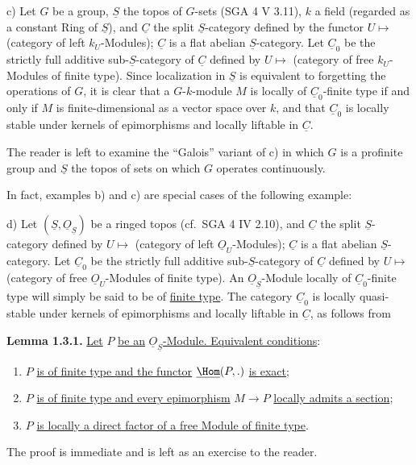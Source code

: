 c) Let \(G\) be a group, \(\underline{S}\) the topos of \(G\)-sets (SGA 4 V 3.11), \(k\) a field (regarded as a constant Ring of \(\underline{S}\)), and \(\underline{C}\) the split \(\underline{S}\)-category defined by the functor \(U\longmapsto\) (category of left \(k_U\)-Modules); \(\underline{C}\) is a flat abelian \(\underline{S}\)-category. Let \(\underline{C}_0\) be the strictly full additive sub-\(\underline{S}\)-category of \(\underline{C}\) defined by \(U\longmapsto\) (category of free \(k_U\)-Modules of finite type).
Since localization in \(\underline{S}\) is equivalent to forgetting the operations of \(G\), it is clear that a \(G\)-\(k\)-module \(M\) is locally of \(\underline{C}_0\)-finite type if and only if \(M\) is finite-dimensional as a vector space over \(k\), and that \(\underline{C}_0\) is locally stable under kernels of epimorphisms and locally liftable in \(\underline{C}\).

The reader is left to examine the ``Galois'' variant of c) in which \(G\) is a profinite group and \(\underline{S}\) the topos of sets on which \(G\) operates continuously.

%
In fact, examples b) and c) are special cases of the following example:

d) Let \((\underline{S},\underline{O}_{\underline{S}})\) be a ringed topos (cf.\ SGA 4 IV 2.10), and \(\underline{C}\) the split \(\underline{S}\)-category defined by \(U\longmapsto\) (category of left \(\underline{O}_U\)-Modules); \(\underline{C}\) is a flat abelian \(\underline{S}\)-category. Let \(\underline{C}_0\) be the strictly full additive sub-\(\underline{S}\)-category of \(\underline{C}\) defined by \(U\longmapsto\) (category of free \(\underline{O}_U\)-Modules of finite type). An \(\underline{O}_{\underline{S}}\)-Module locally of \(\underline{C}_0\)-finite type will simply be said to be of \uline{finite type}. The category \(\underline{C}_0\) is locally quasi-stable under kernels of epimorphisms and locally liftable in \(\underline{C}\), as follows from

\textbf{Lemma 1.3.1.} \uline{Let} \(P\) \uline{be an} \(\underline{O}_{\underline{S}}\)\uline{-Module. Equivalent conditions}:
\begin{enumerate}[label=(\roman*)]
\item \(P\) \uline{is of finite type and the functor} \(\underline{\Hom}(P,.)\) \uline{is exact};
\item \(P\) \uline{is of finite type and every epimorphism} \(M\to P\) \uline{locally admits a section};
\item \(P\) \uline{is locally a direct factor of a free Module of finite type}.
\end{enumerate}
The proof is immediate and is left as an exercise to the reader.


